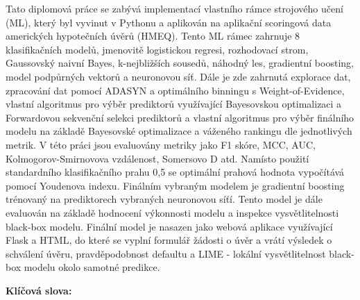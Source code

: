 Tato diplomov\'{a} pr\'{a}ce se zab\'{y}v\'{a} implementac\'{i} vlastn\'{i}ho r\'{a}mce strojov\'{e}ho u\v{c}en\'{i} (ML), kter\'{y} byl vyvinut v Pythonu a aplikov\'{a}n na aplika\v{c}n\'{i} scoringov\'{a} data americk\'{y}ch hypote\v{c}n\'{i}ch \'{u}v\v{e}r\r{u} (HMEQ).
Tento ML r\'{a}mec zahrnuje 8 klasifika\v{c}n\'{i}ch model\r{u}, jmenovit\v{e} logistickou regresi, rozhodovac\'{i} strom, Gaussovsk\'{y} naivn\'{i} Bayes, k-nejbli\v{z}\v{s}\'{i}ch soused\r{u}, n\'{a}hodn\'{y} les, gradientn\'{i} boosting, model podp\r{u}rn\'{y}ch vektor\r{u} a neuronovou s\'{i}\v{t}.
D\'{a}le je zde zahrnut\'{a} explorace dat, zpracov\'{a}n\'{i} dat pomoc\'{i} ADASYN a optim\'{a}ln\'{i}ho binningu s Weight-of-Evidence, vlastn\'{i} algoritmus pro v\'{y}b\v{e}r prediktor\r{u} vyu\v{z}\'{i}vaj\'{i}c\'{i} Bayesovskou optimalizaci a Forwardovou sekven\v{c}n\'{i} selekci prediktor\r{u} a
vlastn\'{i} algoritmus pro v\'{y}b\v{e}r fin\'{a}ln\'{i}ho modelu na z\'{a}klad\v{e} Bayesovsk\'{e} optimalizace a v\'{a}\v{z}en\'{e}ho rankingu dle jednotliv\'{y}ch metrik. V t\'{e}to pr\'{a}ci jsou evaluov\'{a}ny metriky jako F1 sk\'{o}re, MCC, AUC, Kolmogorov-Smirnovova vzd\'{a}lenost, Somersovo D atd.
Nam\'{i}sto pou\v{z}it\'{i} standardn\'{i}ho klasifika\v{c}n\'{i}ho prahu 0,5 se optim\'{a}ln\'{i} prahov\'{a} hodnota vypo\v{c}\'{i}t\'{a}v\'{a} pomoc\'{i} Youdenova indexu.
Fin\'{a}ln\'{i}m vybran\'{y}m modelem je gradientn\'{i} boosting tr\'{e}novan\'{y} na prediktorech vybran\'{y}ch neuronovou s\'{i}\v{t}\'{i}.
Tento model je d\'{a}le evaluov\'{a}n na z\'{a}klad\v{e} hodnocen\'{i} v\'{y}konnosti modelu a inspekce vysv\v{e}tlitelnosti black-box modelu.
Fin\'{a}ln\'{i} model je nasazen jako webov\'{a} aplikace vyu\v{z}\'{i}vaj\'{i}c\'{i} Flask a HTML, do kter\'{e} se vypln\'{i} formul\'{a}\v{r} \v{z}\'{a}dosti o \'{u}v\v{e}r a vr\'{a}t\'{i} v\'{y}sledek o schv\'{a}len\'{i} \'{u}v\v{e}ru, pravd\v{e}podobnost defaultu a LIME - lok\'{a}ln\'{i} vysv\v{e}tlitelnost black-box modelu okolo samotn\'{e} predikce.

\bigskip

\textbf{Kl\'{i}\v{c}ov\'{a} slova:} \Klic

